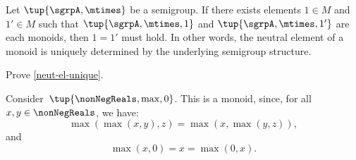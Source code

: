 \begin{lemma}
  \label{neut-el-unique}
  Let $\tup{\sgrpA, \mtimes}$ be a semigroup. If there exists elements $1 \in M$ and $1' \in M$ such that $\tup{\sgrpA, \mtimes, 1}$ and $\tup{\sgrpA, \mtimes, 1'}$ are each monoids, then $1 = 1'$ must hold. In other words, the neutral element of a monoid is uniquely determined by the underlying semigroup structure.
\end{lemma}

\begin{exercise}
  Prove \cref{neut-el-unique}.
\end{exercise}
\begin{solution}
\end{solution}



\begin{example}
  Consider~$\tup{\nonNegReals,\max,0}$. This is a monoid, since, for all~$x,y\in \nonNegReals$, we have:
  \begin{equation*}
    \max(\max(x,y),z)=\max(x,\max(y,z)),
  \end{equation*}
  and
  \begin{equation*}
    \max(x,0)=x=\max(0,x).
  \end{equation*}
\end{example}




